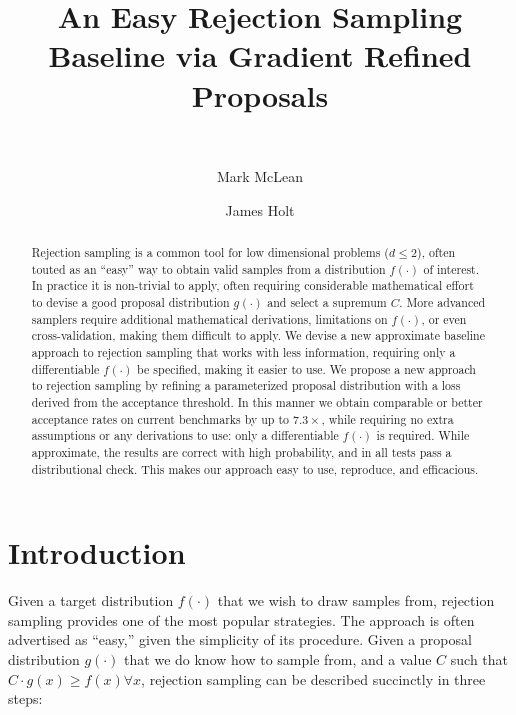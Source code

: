 \documentclass{ecai}  %
\begin{document}
\begin{frontmatter}

\title{An Easy Rejection Sampling Baseline via Gradient Refined Proposals}

%
%
%
\author[A,B,C,D]{~}
\author[A]{Mark McLean}
\author[A]{James Holt}


\address[A]{Laboratory for Physical Sciences}
\address[B]{Booz Allen Hamilton}
\address[C]{Syracuse University}
\address[D]{University of Maryland, Baltimore County}
%

\begin{abstract}
Rejection sampling is a common tool for low dimensional problems ($d \leq 2$), often touted as an ``easy'' way to obtain valid samples from a distribution $f(\cdot)$ of interest. In practice it is non-trivial to apply, often requiring considerable mathematical effort to devise a good proposal distribution $g(\cdot)$ and select a supremum $C$. More advanced samplers require additional mathematical derivations, limitations on $f(\cdot)$, or even cross-validation, making them difficult to apply. We devise a new approximate baseline approach to rejection sampling that works with less information, requiring only a differentiable $f(\cdot)$ be specified, making it easier to use. We propose a new approach to rejection sampling by refining a parameterized proposal distribution with a loss derived from the acceptance threshold. In this manner we obtain comparable or better acceptance rates on current benchmarks by up to $7.3\times$, while requiring no extra assumptions or any derivations to use: only a differentiable $f(\cdot)$ is required. While approximate, the results are correct with high probability, and in all tests pass a distributional check. This makes our approach easy to use, reproduce, and efficacious. 
\end{abstract}


\end{frontmatter}




\section{Introduction}


Given a target distribution $f(\cdot)$ that we wish to draw samples from, rejection sampling provides one of the most popular strategies. The approach is often advertised as ``easy,'' given the simplicity of its procedure. Given a proposal distribution $g(\cdot)$ that we do know how to sample from, and a value $C$ such that $C \cdot g(x) \geq f(x) \forall x$, rejection sampling can be described succinctly in three steps:
\end{document}
